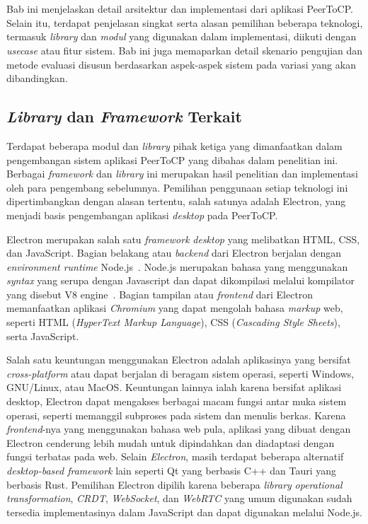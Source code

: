 \chapter{\babEmpat}
\label{bab:4}

Bab ini menjelaskan detail arsitektur dan implementasi dari aplikasi PeerToCP. Selain itu, terdapat penjelasan singkat serta alasan pemilihan beberapa teknologi, termasuk \textit{library} dan \textit{modul} yang digunakan dalam implementasi, diikuti dengan \textit{usecase} atau fitur sistem. Bab ini juga memaparkan detail skenario pengujian dan metode evaluasi disusun berdasarkan aspek-aspek sistem pada variasi yang akan dibandingkan.

\section{\textit{Library} dan \textit{Framework} Terkait}

Terdapat beberapa modul dan \textit{library} pihak ketiga yang dimanfaatkan dalam pengembangan sistem aplikasi PeerToCP yang dibahas dalam penelitian ini. Berbagai \textit{framework} dan \textit{library} ini merupakan hasil penelitian dan implementasi oleh para pengembang sebelumnya. Pemilihan penggunaan setiap teknologi ini dipertimbangkan dengan alasan tertentu, salah satunya adalah Electron, yang menjadi basis pengembangan aplikasi \textit{desktop} pada PeerToCP.

Electron merupakan salah satu \textit{framework} \textit{desktop} yang melibatkan HTML, CSS, dan JavaScript. Bagian belakang atau \textit{backend} dari Electron berjalan dengan \textit{environment runtime} Node.js~\citep{kredpattanakul2018transforming, miglanielectron}. Node.js merupakan bahasa yang menggunakan \textit{syntax} yang serupa dengan Javascript dan dapat dikompilasi melalui kompilator yang disebut V8 engine~\citep{tilkov2010node}. Bagian tampilan atau \textit{frontend} dari Electron memanfaatkan aplikasi \textit{Chromium} yang dapat mengolah bahasa \textit{markup} web, seperti HTML (\textit{HyperText Markup Language}), CSS (\textit{Cascading Style Sheets}), serta JavaScript.

Salah satu keuntungan menggunakan Electron adalah aplikasinya yang bersifat \textit{cross-platform} atau dapat berjalan di beragam sistem operasi, seperti Windows, GNU/Linux, atau MacOS. Keuntungan lainnya ialah karena bersifat aplikasi desktop, Electron dapat mengakses berbagai macam fungsi antar muka sistem operasi, seperti memanggil subproses pada sistem dan menulis berkas. Karena \textit{frontend}-nya yang menggunakan bahasa web pula, aplikasi yang dibuat dengan Electron cenderung lebih mudah untuk dipindahkan dan diadaptasi dengan fungsi terbatas pada web. Selain \textit{Electron}, masih terdapat beberapa alternatif \textit{desktop-based framework} lain seperti Qt yang berbasis C++ dan Tauri yang berbasis Rust. Pemilihan Electron dipilih karena beberapa \textit{library} \textit{operational transformation}, \textit{CRDT}, \textit{WebSocket}, dan \textit{WebRTC} yang umum digunakan sudah tersedia implementasinya dalam JavaScript dan dapat digunakan melalui Node.js.

